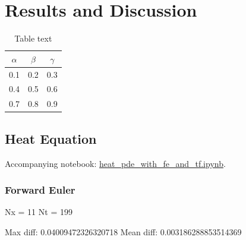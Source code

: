 \section{Results and Discussion}\label{sec:Results}
\begin{table}[H]
\caption{Table text}
\centering
{}
\begin{tabular}{ccc}
\hline
\hline 
$\alpha$ & $\beta$ & $\gamma$
\\
\hline 
\hline 
0.1 & 0.2 & 0.3
\\
0.4 & 0.5 & 0.6
\\
0.7 & 0.8 & 0.9
\\
\hline
\hline 
\end{tabular}
\label{tab:tab1}
\end{table}


\subsection{Heat Equation}\label{sec:heateq results}
Accompanying notebook: \href{https://github.com/nicolossus/FYS-STK4155-Project3/blob/master/notebooks/heat_pde_with_fe_and_tf.ipynb}{heat\_pde\_with\_fe\_and\_tf.ipynb}.

\subsubsection{Forward Euler}
Nx = 11
Nt = 199

Max diff: 0.04009472326320718
Mean diff: 0.003186288853514369

